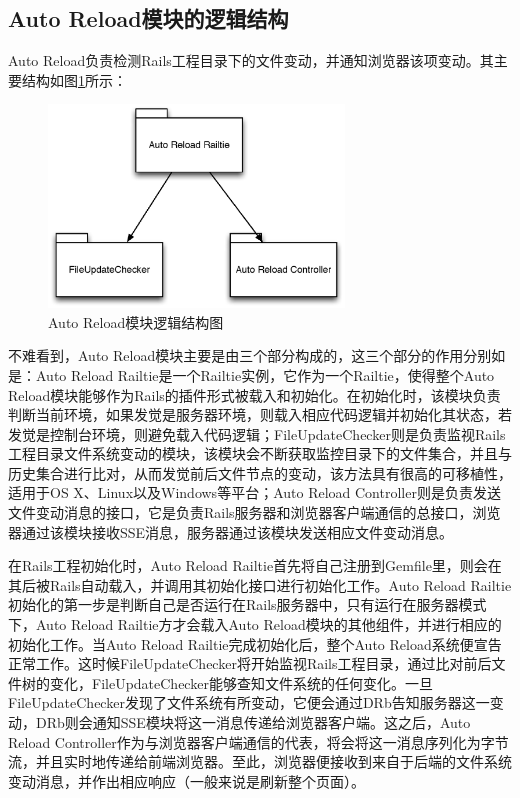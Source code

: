 \subsection{Auto Reload模块的逻辑结构}
Auto Reload负责检测Rails工程目录下的文件变动，并通知浏览器该项变动。其主要结构如图\ref{fig-reload-struct}所示：

\begin{figure}[h]
\centering
\includegraphics[width=0.7\textwidth]{images/overview/auto_reload_struct.eps}
\caption{Auto Reload模块逻辑结构图}
\label{fig-reload-struct}
\end{figure}

不难看到，Auto Reload模块主要是由三个部分构成的，这三个部分的作用分别如是：Auto Reload Railtie是一个Railtie实例，它作为一个Railtie，使得整个Auto Reload模块能够作为Rails的插件形式被载入和初始化。在初始化时，该模块负责判断当前环境，如果发觉是服务器环境，则载入相应代码逻辑并初始化其状态，若发觉是控制台环境，则避免载入代码逻辑；FileUpdateChecker则是负责监视Rails工程目录文件系统变动的模块，该模块会不断获取监控目录下的文件集合，并且与历史集合进行比对，从而发觉前后文件节点的变动，该方法具有很高的可移植性，适用于OS X、Linux以及Windows等平台；Auto Reload Controller则是负责发送文件变动消息的接口，它是负责Rails服务器和浏览器客户端通信的总接口，浏览器通过该模块接收SSE消息，服务器通过该模块发送相应文件变动消息。

在Rails工程初始化时，Auto Reload Railtie首先将自己注册到Gemfile里，则会在其后被Rails自动载入，并调用其初始化接口进行初始化工作。Auto Reload Railtie初始化的第一步是判断自己是否运行在Rails服务器中，只有运行在服务器模式下，Auto Reload Railtie方才会载入Auto Reload模块的其他组件，并进行相应的初始化工作。当Auto Reload Railtie完成初始化后，整个Auto Reload系统便宣告正常工作。这时候FileUpdateChecker将开始监视Rails工程目录，通过比对前后文件树的变化，FileUpdateChecker能够查知文件系统的任何变化。一旦FileUpdateChecker发现了文件系统有所变动，它便会通过DRb告知服务器这一变动，DRb则会通知SSE模块将这一消息传递给浏览器客户端。这之后，Auto Reload Controller作为与浏览器客户端通信的代表，将会将这一消息序列化为字节流，并且实时地传递给前端浏览器。至此，浏览器便接收到来自于后端的文件系统变动消息，并作出相应响应（一般来说是刷新整个页面）。

